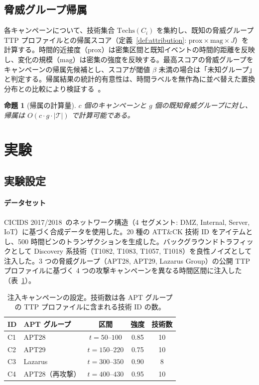 \documentclass[11pt]{article}
\newtheorem{proposition}{命題}
\begin{document}
\subsection{脅威グループ帰属}

各キャンペーンについて、技術集合 $\mathrm{Techs}(C_i)$ を集約し、既知の脅威グループ TTP プロファイルとの帰属スコア（定義~\ref{def:attribution}: $\mathrm{prox} \times \mathrm{mag} \times J$）を計算する。時間的近接度（$\mathrm{prox}$）は密集区間と既知イベントの時間的距離を反映し、変化の規模（$\mathrm{mag}$）は密集の強度を反映する。最高スコアの脅威グループをキャンペーンの帰属先候補とし、スコアが閾値 $\beta$ 未満の場合は「未知グループ」と判定する。帰属結果の統計的有意性は、時間ラベルを無作為に並べ替えた置換分布との比較により検証する~\cite{lancaster2018surrogate}。

\begin{proposition}[帰属の計算量]
$c$ 個のキャンペーンと $g$ 個の既知脅威グループに対し、帰属は $O(c \cdot g \cdot |\mathcal{T}|)$ で計算可能である。
\end{proposition}

\section{実験}\label{sec:experiments}

\subsection{実験設定}

\paragraph{データセット}
CICIDS 2017/2018~\cite{sharafaldin2018toward}のネットワーク構造（4 セグメント: DMZ, Internal, Server, IoT）に基づく合成データを使用した。20 種の ATT\&CK 技術 ID をアイテムとし、500 時間ビンのトランザクションを生成した。バックグラウンドトラフィックとして Discovery 系技術（T1082, T1083, T1057, T1018）を良性ノイズとして注入した。3 つの脅威グループ（APT28, APT29, Lazarus Group）の公開 TTP プロファイルに基づく 4 つの攻撃キャンペーンを異なる時間区間に注入した（表~\ref{tab:campaigns}）。

\begin{table}[t]
\centering
\caption{注入キャンペーンの設定。技術数は各 APT グループの TTP プロファイルに含まれる技術 ID の数。}
\label{tab:campaigns}
\begin{tabular}{llccc}
\toprule
ID & APT グループ & 区間 & 強度 & 技術数 \\
\midrule
C1 & APT28 & $t = 50$--$100$ & 0.85 & 10 \\
C2 & APT29 & $t = 150$--$220$ & 0.75 & 10 \\
C3 & Lazarus & $t = 300$--$350$ & 0.90 & 8 \\
C4 & APT28（再攻撃） & $t = 400$--$430$ & 0.95 & 10 \\
\bottomrule
\end{tabular}
\end{table}
\end{document}
